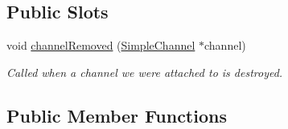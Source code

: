 \subsection*{Public Slots}
\begin{DoxyCompactItemize}
\item 
void \hyperlink{classSimpleNetDevice_ab0820d8c23bc64c58824e70a830d2e5d}{channel\+Removed} (\hyperlink{classSimpleChannel}{Simple\+Channel} $\ast$channel)
\begin{DoxyCompactList}\small\item\em Called when a channel we were attached to is destroyed. \end{DoxyCompactList}\end{DoxyCompactItemize}
\subsection*{Public Member Functions}
